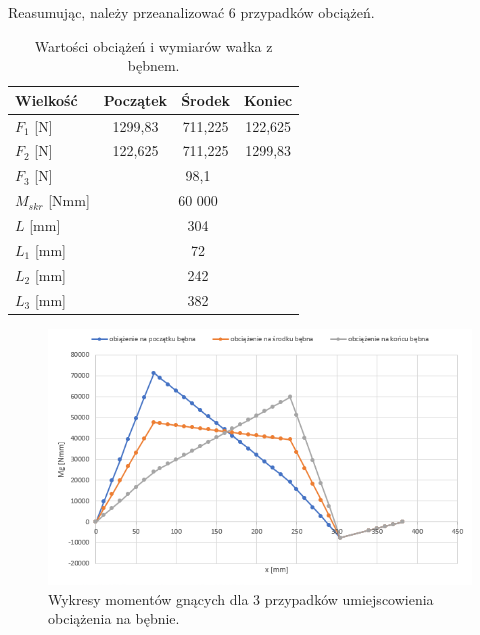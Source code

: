        		Reasumując, należy przeanalizować 6 przypadków obciążeń. 
       		
       		\begin{table}[h]
       			\centering
       			\begin{tabular}{l|c|c|c}
       				Wielkość & Początek & Środek & Koniec \\ \hline \hline
       				$F_1$ [N]& 1299,83 & 711,225 & 122,625 \\ 
       				$F_2$ [N]& 122,625 & 711,225 & 1299,83 \\ 
       				$F_3$ [N] & \multicolumn{3}{|c|}{98,1}\\
       				$M_{skr}$ [Nmm] &  \multicolumn{3}{|c|}{60 000} \\
       				$L$ [mm] & \multicolumn{3}{|c|}{304} \\
       				$L_1$ [mm] & \multicolumn{3}{|c|}{72}\\
       				$L_2$ [mm]  & \multicolumn{3}{|c|}{242} \\
       				$L_3$ [mm]  & \multicolumn{3}{|c|}{382} \\
       				
       				\hline
       			\end{tabular}
       			\caption{Wartości obciążeń i wymiarów wałka z bębnem.}
       			\label{tab::beben}
       		\end{table}
        	
        	\begin{figure}[th]
        		\centering
        		\includegraphics[width=0.9\linewidth]{Projekt/momenty_gnace_rozwijanie}
        		\caption{Wykresy momentów gnących dla 3 przypadków umiejscowienia obciążenia na bębnie.} 
        		\label{fig::momenty_gnace_rozwijanie}
        	\end{figure}
        
